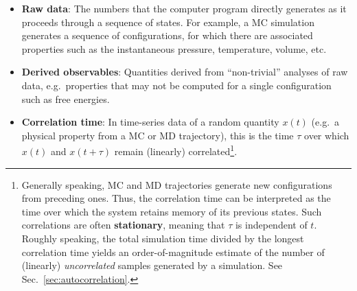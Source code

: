 \begin{itemize}
  
\item {\bf Raw data}: The numbers that the computer program directly generates as it proceeds through a sequence of states.
For example, a MC simulation generates a sequence of configurations, for which there are associated properties such as the instantaneous pressure, temperature, volume, etc.
\label{def:raw_data}
\item {\bf Derived observables}: Quantities derived from ``non-trivial'' analyses of raw data, e.g.\ properties that may not be computed for a single configuration such as free energies.
  \label{def:deriv_obs}
  
  



\item {\bf Correlation time}: In time-series data of a random quantity $x(t)$ (e.g.\ a physical property from a MC or MD trajectory), this is the time $\tau$ over which $x(t)$ and $x(t+\tau)$ remain (linearly) correlated\footnote{Generally speaking, MC and MD trajectories generate new configurations from preceding ones.
Thus, the correlation time can be interpreted as the time over which the system retains memory of its previous states.
Such correlations are often {\bf stationary}, meaning that $\tau$ is independent of $t$.
Roughly speaking, the total simulation time divided by the longest correlation time yields an order-of-magnitude estimate of the number of (linearly) {\it uncorrelated} samples generated by a simulation. See Sec.~\ref{sec:autocorrelation}.}.
\label{def:corr_time}


\end{itemize}
